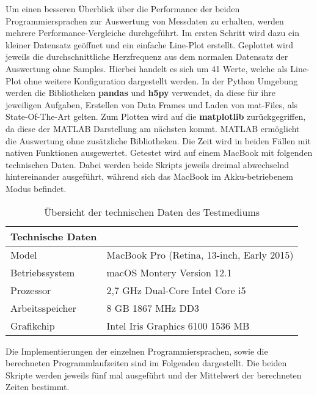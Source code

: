 Um einen besseren Überblick über die Performance der beiden Programmiersprachen zur Auswertung von Messdaten zu erhalten, werden mehrere Performance-Vergleiche durchgeführt. Im ersten Schritt wird dazu ein kleiner Datensatz geöffnet und ein einfache Line-Plot erstellt. Geplottet wird jeweils die durchschnittliche Herzfrequenz aus dem normalen Datensatz der Auswertung ohne Samples. Hierbei handelt es sich um 41 Werte, welche als Line-Plot ohne weitere Konfiguration dargestellt werden. In der Python Umgebung werden die Bibliotheken \textbf{pandas} und \textbf{h5py} verwendet, da diese für ihre jeweiligen Aufgaben, Erstellen von Data Frames und Laden von mat-Files, als State-Of-The-Art gelten. Zum Plotten wird auf die \textbf{matplotlib} zurückgegriffen, da diese der MATLAB Darstellung am nächsten kommt. MATLAB ermöglicht die Auswertung ohne zusätzliche Bibliotheken. Die Zeit wird in beiden Fällen mit nativen Funktionen ausgewertet. Getestet wird auf einem MacBook mit folgenden technischen Daten. Dabei werden beide Skripts jeweils dreimal abwechselnd hintereinander ausgeführt, während sich das MacBook im Akku-betriebenem Modus befindet.


\begin{table}[H]
	\centering
	\begin{tabular}{|l|l|}
		\multicolumn{1}{l}{\textbf{Technische Daten}} & \multicolumn{1}{l}{}                       \\ 
		\hline
		Model                                         & MacBook Pro (Retina, 13-inch, Early 2015)  \\ 
		\hline
		Betriebssystem                                & macOS Montery Version 12.1                 \\ 
		\hline
		Prozessor                                     & 2,7 GHz Dual-Core Intel Core i5            \\ 
		\hline
		Arbeitsspeicher                               & 8 GB 1867 MHz DD3                          \\ 
		\hline
		Grafikchip                                    & Intel Iris Graphics 6100 1536 MB           \\
		\hline
	\end{tabular}
	\caption{Übersicht der technischen Daten des Testmediums}
\end{table}

Die Implementierungen der einzelnen Programmiersprachen, sowie die berechneten Programmlaufzeiten sind im Folgenden dargestellt. Die beiden Skripte werden jeweils fünf mal ausgeführt und der Mittelwert der berechneten Zeiten bestimmt.

